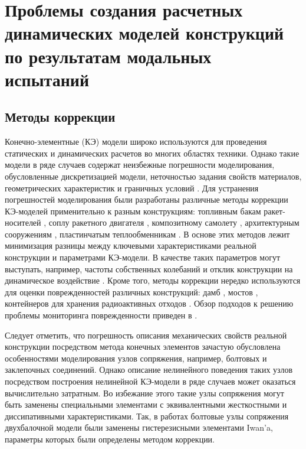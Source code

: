 \chapter{Проблемы создания расчетных динамических моделей конструкций по результатам модальных испытаний}

\section{Методы коррекции} 

Конечно-элементные (КЭ) модели широко используются для проведения статических и динамических расчетов во многих областях техники. Однако такие модели в ряде случаев содержат неизбежные погрешности моделирования, обусловленные дискретизацией модели, неточностью задания свойств материалов, геометрических характеристик и граничных условий \cite{lib:modelUpdating:Bartilson}. Для устранения погрешностей моделирования были разработаны различные методы коррекции КЭ-моделей применительно к разным конструкциям: топливным бакам ракет-носителей \cite{lib:modelUpdating:Li&Tian}, соплу ракетного двигателя \cite{lib:modelUpdating:Yan&Li}, композитному самолету \cite{lib:modelUpdating:Zhao&Gupta}, архитектурным сооружениям \cite{lib:modelUpdating:Girardi&Padovani}, пластинчатым теплообменникам \cite{lib:modelUpdating:Guo&Wang}. В основе этих методов лежит минимизация разницы между ключевыми характеристиками реальной конструкции и параметрами КЭ-модели. В качестве таких параметров могут выступать, например, частоты собственных колебаний и отклик конструкции на динамическое воздействие \cite{lib:modelUpdating:Petersen&Oiseth}. Кроме того, методы коррекции нередко используются для оценки поврежденностей различных конструкций: дамб \cite{lib:modelUpdating:Bayraktar&Sevim}, мостов \cite{lib:modelUpdating:Cong&Thoi, lib:modelUpdating:Polanco}, контейнеров для хранения радиоактивных отходов \cite{lib:modelUpdating:Eiras}. Обзор подходов к решению проблемы мониторинга поврежденности приведен в \cite{lib:modelUpdating:Simoen}. 

Следует отметить, что погрешность описания механических свойств реальной конструкции посредством метода конечных элементов зачастую обусловлена особенностями моделирования узлов сопряжения, например, болтовых и заклепочных соединений. Однако описание нелинейного поведения таких узлов посредством построения нелинейной КЭ-модели в ряде случаев может оказаться вычислительно затратным. Во избежание этого такие узлы сопряжения могут быть заменены специальными элементами с эквивалентными жесткостными и диссипативными характеристиками. Так, в работах \cite{lib:modelUpdating:Lacayo, lib:modelUpdating:Yuan} болтовые узлы сопряжения двухбалочной модели были заменены гистерезисными элементами Iwan’a, параметры которых были определены методом коррекции. 

